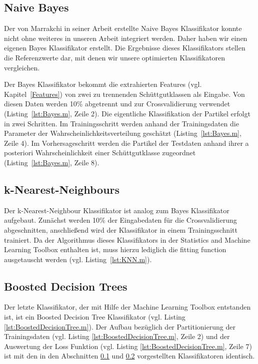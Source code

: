 \subsection{Naive Bayes} \label{NaiveBayes}
Der von Marrakchi in seiner Arbeit \cite{MA} erstellte Naive Bayes Klassifikator konnte nicht ohne weiteres in unseren Arbeit integriert werden. Daher haben wir einen eigenen Bayes Klassifikator erstellt. Die Ergebnisse dieses Klassifikators stellen die Referenzwerte dar, mit denen wir unsere optimierten Klassifikatoren vergleichen.

Der Bayes Klassifikator bekommt die extrahierten Features (vgl. Kapitel~\ref{Features}) von zwei zu trennenden Schüttgutklassen als Eingabe. Von diesen Daten werden 10\% abgetrennt und zur Crossvalidierung verwendet (Listing~\ref{lst:Bayes.m}, Zeile 2). Die eigentliche Klassifikation der Partikel erfolgt in zwei Schritten. Im Trainingsschritt werden anhand der Trainingsdaten die Parameter der Wahrscheinlichkeitsverteilung geschätzt (Listing~\ref{lst:Bayes.m}, Zeile 4). Im Vorhersageschritt werden die Partikel der Testdaten anhand ihrer a posteriori Wahrscheinlichkeit einer Schüttgutklasse zugeordnet (Listing~\ref{lst:Bayes.m}, Zeile 8).

\begin{minipage}{\textwidth}

\end{minipage}



\subsection{k-Nearest-Neighbours} \label{KNN}
Der k-Nearest-Neighbour Klassifikator ist analog zum Bayes Klassifikator aufgebaut. Zunächst werden 10\% der Eingabedaten für die Crossvalidierung abgeschnitten, anschließend wird der Klassifikator in einem Trainingsschnitt trainiert. Da der Algorithmus dieses Klassifikators in der Statistics and Machine Learning Toolbox enthalten ist, muss hierzu lediglich die fitting function \cite{FittingFunctions} ausgetauscht werden (vgl. Listing~\ref{lst:KNN.m}).





\subsection{Boosted Decision Trees} \label{BDT}
Der letzte Klassifikator, der mit Hilfe der Machine Learning Toolbox entstanden ist, ist ein Boosted Decision Tree Klassifikator (vgl. Listing \ref{lst:BoostedDecisionTree.m}). Der Aufbau bezüglich der Partitionierung der Trainingsdaten (vgl. Listing \ref{lst:BoostedDecisionTree.m}, Zeile 2) und der Auswertung der Loss Funktion (vgl. Listing \ref{lst:BoostedDecisionTree.m}, Zeile 7) ist mit den in den Abschnitten \ref{NaiveBayes} und \ref{KNN} vorgestellten Klassifikatoren identisch.

